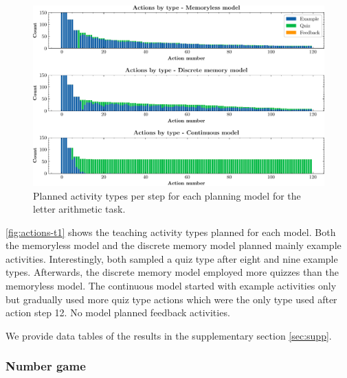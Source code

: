 \begin{figure}[h!]
    \centering
    \includegraphics[width=\linewidth]{figures/letter-actions-pre.pdf}
    \caption{Planned activity types per step for each planning model for the letter arithmetic task. 
    }
    \label{fig:actions-t1}
\end{figure}

\autoref{fig:actions-t1} shows the teaching activity types planned for each model.
Both the memoryless model and the discrete memory model planned mainly example activities.
Interestingly, both sampled a quiz type after eight and nine example types.
Afterwards, the discrete memory model employed more quizzes than the memoryless model.
The continuous model started with example activities only but gradually used more quiz type actions which were the only type used after action step 12.
No model planned feedback activities.


We provide data tables of the results in the supplementary section \ref{sec:supp}.

\subsubsection{Number game}



